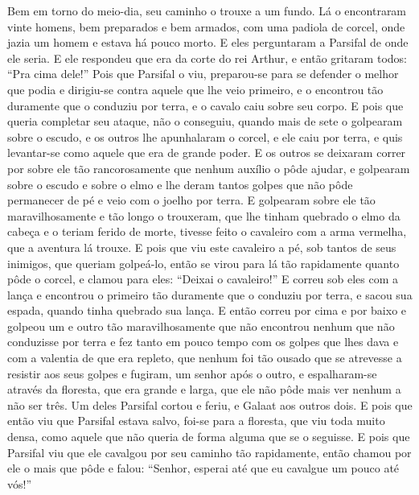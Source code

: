 Bem em torno do meio-dia, seu caminho o trouxe a um fundo. Lá o encontraram
vinte homens, bem preparados e bem armados, com uma padiola de corcel, onde
jazia um homem e estava há pouco morto. E eles perguntaram a Parsifal de onde
ele seria. E ele respondeu que era da corte do rei Arthur, e então gritaram
todos: “Pra cima dele!” Pois que Parsifal o viu, preparou-se para se defender
o melhor que podia e dirigiu-se contra aquele que lhe veio primeiro, e o
encontrou tão duramente que o conduziu por terra, e o cavalo caiu sobre seu
corpo. E pois que queria completar seu ataque, não o conseguiu, quando mais de
sete o golpearam sobre o escudo, e os outros lhe apunhalaram o corcel, e ele
caiu por terra, e quis levantar-se como aquele que era de grande poder. E os
outros se deixaram correr por sobre ele tão rancorosamente que nenhum auxílio o
pôde ajudar, e golpearam sobre o escudo e sobre o elmo e lhe deram tantos
golpes que não pôde permanecer de pé e veio com o joelho por terra. E golpearam
sobre ele tão maravilhosamente e tão longo o trouxeram, que lhe tinham quebrado
o elmo da cabeça e o teriam ferido de morte, tivesse feito o cavaleiro com a
arma vermelha, que a aventura lá trouxe. E pois que viu este cavaleiro a pé,
sob tantos de seus inimigos, que queriam golpeá-lo, então se virou para lá tão
rapidamente quanto pôde o corcel, e clamou para eles: “Deixai o cavaleiro!” E
correu sob eles com a lança e encontrou o primeiro tão duramente que o conduziu
por terra, e sacou sua espada, quando tinha quebrado sua lança. E então correu
por cima e por baixo e golpeou um e outro tão maravilhosamente que não
encontrou nenhum que não conduzisse por terra e fez tanto em pouco tempo com
os golpes que lhes dava e com a valentia de que era repleto, que nenhum foi tão
ousado que se atrevesse a resistir aos seus golpes e fugiram, um senhor após o
outro, e espalharam-se através da floresta, que era grande e larga, que ele não
pôde mais ver nenhum a não ser três. Um deles Parsifal cortou e feriu, e
Galaat aos outros dois. E pois que então viu que Parsifal estava salvo, foi-se
para a floresta, que viu toda muito densa,  como aquele que não queria de forma
alguma que se o seguisse. E pois que Parsifal viu que ele cavalgou por seu
caminho tão rapidamente, então chamou por ele o mais que pôde e falou: “Senhor,
esperai até que eu cavalgue um pouco até vós!” 

